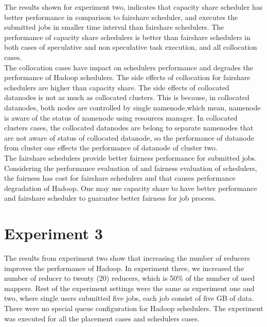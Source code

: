 The results shown for experiment two, indicates that capacity share scheduler has better performance in comparison to fairshare scheduler, and executes the submitted jobs in smaller time interval than fairshare schedulers. The performance of capacity share schedulers is better than fairshare schedulers in both cases of speculative and non speculative task execution, and all collocation cases.\\

The collocation cases have impact on schedulers performance and degrades the performance of Hadoop schedulers. The side effects of collocation for fairshare schedulers are higher than capacity share. The side effects of collocated datanodes is not as much as collocated clusters. This is because, in collocated datanodes, both nodes are controlled by single namenode,which mean, namenode is aware of the status of namenode using resources manager. In collocated clusters cases, the collocated datanodes are belong to separate namenodes that are not aware of status of collocated datanode, so the performance of datanode from cluster one effects the performance of datanode of cluster two.\\  
 

 The fairshare schedulers provide better fairness performance for submitted jobs. Considering the performance evaluation of and fairness evaluation of schedulers, the fairness has cost for fairshare schedulers and that causes performance degradation of Hadoop. One may use capacity share to have better performance and fairshare scheduler to guarantee better fairness for job process.\\




\section{Experiment 3}
The results from experiment two show that increasing the number of reducers improves the performance of Hadoop. In experiment three, we increased the number of reducer to twenty (20) reducers, which is 50\% of the number of used mappers. Rest of the experiment settings were the same as experiment one and two, where single users submitted five jobs, each job consist of five GB of data. There were no special queue configuration for Hadoop schedulers. The experiment was executed for all the placement cases and schedulers cases. 
  
